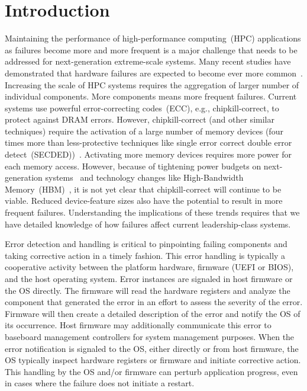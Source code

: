 
\section{Introduction}
\label{sec:intro}



Maintaining the performance of high-performance computing~(HPC) applications as
failures become more and more frequent is a major challenge that needs to be
addressed for next-generation extreme-scale systems.  Many recent studies have
demonstrated that hardware failures are expected to become ever more
common~\cite{Bergman08exascalecomputing}.  Increasing the scale of HPC systems
requires the aggregation of larger number of individual components.  More
components means more frequent failures.  Current systems use powerful
error-correcting codes~(ECC), e.g., chipkill-correct, to protect against DRAM
errors.  However, chipkill-correct (and other similar techniques) require the
activation of a large number of memory devices (four times more than
less-protective techniques like single error correct double error
detect~(SECDED))~\cite{Jian13}.  Activating more memory devices requires more
power for each memory access.  However, because of tightening power budgets on
next-generation systems~\cite{Bergman08exascalecomputing} and technology
changes like High-Bandwidth Memory~(HBM)~\cite{HBM}, it is not yet clear that
chipkill-correct will continue to be viable.  Reduced device-feature sizes also
have the potential to result in more frequent failures.  Understanding the
implications of these trends requires that we have detailed knowledge of how
failures affect current leadership-class systems.

Error detection and handling is critical to pinpointing failing components and
taking corrective action in a timely fashion. This error handling is typically
a cooperative activity between the platform hardware, firmware (UEFI or BIOS),
and the host operating system.  Error instances are signaled in host firmware
or the OS directly. The firmware will read the hardware registers and analyze
the component that generated the error in an effort to assess the severity of
the error. Firmware will then create a detailed description of the error and
notify the OS of its occurrence. Host firmware may additionally communicate
this error to baseboard management controllers for system management purposes.
When the error notification is signaled to the OS, either directly or from host
firmware, the OS typically inspect hardware registers or firmware and initiate
corrective action.  This handling by the OS and/or firmware can perturb
application progress, even in cases where the failure does not initiate a
restart.

